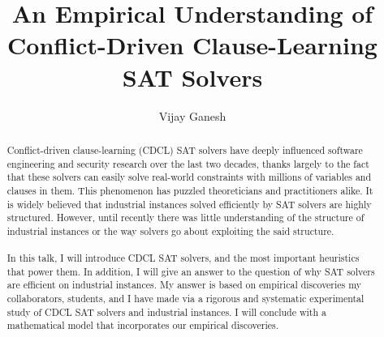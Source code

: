 \documentclass[EPiCempty]{easychair}
\begin{document}
\title{An Empirical Understanding of Conflict-Driven Clause-Learning SAT Solvers}
\author{Vijay Ganesh}


\maketitle
\begin{abstract}
Conflict-driven clause-learning (CDCL) SAT solvers have deeply influenced
software engineering and security research over the last two decades, thanks
largely to the fact that these solvers can easily solve real-world constraints
with millions of variables and clauses in them. This phenomenon has puzzled
theoreticians and practitioners alike. It is widely believed that industrial
instances solved efficiently by SAT solvers are highly structured. However,
until recently there was little understanding of the structure of industrial
instances or the way solvers go about exploiting the said structure.
\\\\
In this talk, I will introduce CDCL SAT solvers, and the most important
heuristics that power them. In addition, I will give an answer to the question
of why SAT solvers are efficient on industrial instances. My answer is based on
empirical discoveries my collaborators, students, and I have made via a
rigorous and systematic experimental study of CDCL SAT solvers and industrial
instances. I will conclude with a mathematical model that incorporates our
empirical discoveries.
\end{abstract}
\end{document}
